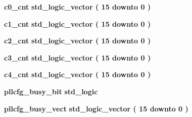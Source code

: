 \begin{DoxyCompactItemize}
\item 
{\bf c0\+\_\+cnt} {\bfseries \textcolor{comment}{std\+\_\+logic\+\_\+vector}\textcolor{vhdlchar}{ }\textcolor{vhdlchar}{(}\textcolor{vhdlchar}{ }\textcolor{vhdlchar}{ } \textcolor{vhdldigit}{15} \textcolor{vhdlchar}{ }\textcolor{keywordflow}{downto}\textcolor{vhdlchar}{ }\textcolor{vhdlchar}{ } \textcolor{vhdldigit}{0} \textcolor{vhdlchar}{ }\textcolor{vhdlchar}{)}\textcolor{vhdlchar}{ }} 
\item 
{\bf c1\+\_\+cnt} {\bfseries \textcolor{comment}{std\+\_\+logic\+\_\+vector}\textcolor{vhdlchar}{ }\textcolor{vhdlchar}{(}\textcolor{vhdlchar}{ }\textcolor{vhdlchar}{ } \textcolor{vhdldigit}{15} \textcolor{vhdlchar}{ }\textcolor{keywordflow}{downto}\textcolor{vhdlchar}{ }\textcolor{vhdlchar}{ } \textcolor{vhdldigit}{0} \textcolor{vhdlchar}{ }\textcolor{vhdlchar}{)}\textcolor{vhdlchar}{ }} 
\item 
{\bf c2\+\_\+cnt} {\bfseries \textcolor{comment}{std\+\_\+logic\+\_\+vector}\textcolor{vhdlchar}{ }\textcolor{vhdlchar}{(}\textcolor{vhdlchar}{ }\textcolor{vhdlchar}{ } \textcolor{vhdldigit}{15} \textcolor{vhdlchar}{ }\textcolor{keywordflow}{downto}\textcolor{vhdlchar}{ }\textcolor{vhdlchar}{ } \textcolor{vhdldigit}{0} \textcolor{vhdlchar}{ }\textcolor{vhdlchar}{)}\textcolor{vhdlchar}{ }} 
\item 
{\bf c3\+\_\+cnt} {\bfseries \textcolor{comment}{std\+\_\+logic\+\_\+vector}\textcolor{vhdlchar}{ }\textcolor{vhdlchar}{(}\textcolor{vhdlchar}{ }\textcolor{vhdlchar}{ } \textcolor{vhdldigit}{15} \textcolor{vhdlchar}{ }\textcolor{keywordflow}{downto}\textcolor{vhdlchar}{ }\textcolor{vhdlchar}{ } \textcolor{vhdldigit}{0} \textcolor{vhdlchar}{ }\textcolor{vhdlchar}{)}\textcolor{vhdlchar}{ }} 
\item 
{\bf c4\+\_\+cnt} {\bfseries \textcolor{comment}{std\+\_\+logic\+\_\+vector}\textcolor{vhdlchar}{ }\textcolor{vhdlchar}{(}\textcolor{vhdlchar}{ }\textcolor{vhdlchar}{ } \textcolor{vhdldigit}{15} \textcolor{vhdlchar}{ }\textcolor{keywordflow}{downto}\textcolor{vhdlchar}{ }\textcolor{vhdlchar}{ } \textcolor{vhdldigit}{0} \textcolor{vhdlchar}{ }\textcolor{vhdlchar}{)}\textcolor{vhdlchar}{ }} 
\item 
{\bf pllcfg\+\_\+busy\+\_\+bit} {\bfseries \textcolor{comment}{std\+\_\+logic}\textcolor{vhdlchar}{ }} 
\item 
{\bf pllcfg\+\_\+busy\+\_\+vect} {\bfseries \textcolor{comment}{std\+\_\+logic\+\_\+vector}\textcolor{vhdlchar}{ }\textcolor{vhdlchar}{(}\textcolor{vhdlchar}{ }\textcolor{vhdlchar}{ } \textcolor{vhdldigit}{15} \textcolor{vhdlchar}{ }\textcolor{keywordflow}{downto}\textcolor{vhdlchar}{ }\textcolor{vhdlchar}{ } \textcolor{vhdldigit}{0} \textcolor{vhdlchar}{ }\textcolor{vhdlchar}{)}\textcolor{vhdlchar}{ }} 

\end{DoxyCompactItemize}
